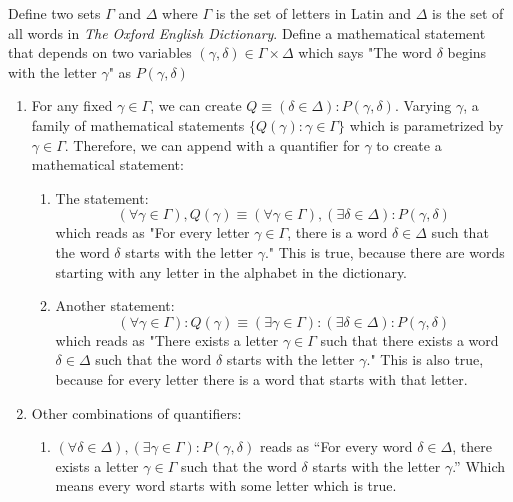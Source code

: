 \begin{example}
    Define two sets $\Gamma$ and $\Delta$ where $\Gamma$ is the set of letters in Latin and $\Delta$ is the set of all words in \textit{The Oxford English Dictionary}.
    Define a mathematical statement that depends on two variables $(\gamma,\delta) \in \Gamma \times \Delta$ which says "The word $\delta$ begins with the letter $\gamma$" as $P(\gamma,\delta)$

    \begin{enumerate}
        \item For any fixed $\gamma \in \Gamma$, we can create $Q \equiv (\delta \in \Delta): P(\gamma,\delta)$. Varying $\gamma$, a family of mathematical statements $\{Q(\gamma):\gamma \in \Gamma\}$ which is parametrized by $\gamma \in \Gamma$. Therefore, we can append with a quantifier for $\gamma$ to create a mathematical statement:
            \begin{enumerate}[label=(\alph*)]
                \item The statement:
                    $$
                    (\forall \gamma \in \Gamma), Q(\gamma) \equiv (\forall \gamma \in \Gamma), (\exists \delta \in \Delta) : P(\gamma,\delta)
                    $$
                    \noindent which reads as "For every letter $\gamma \in \Gamma$, there is a word $\delta \in \Delta$ such that the word $\delta$ starts with the letter $\gamma$." This is true, because there are words starting with any letter in the alphabet in the dictionary.

                \item Another statement:
                    $$
                    (\forall \gamma \in \Gamma): Q(\gamma) \equiv (\exists \gamma \in \Gamma) : (\exists \delta \in \Delta) : P(\gamma,\delta)
                    $$
                    \noindent which reads as "There exists a letter $\gamma \in \Gamma$ such that there exists a word $\delta \in \Delta$ such that the word $\delta$ starts with the letter $\gamma$." This is also true, because for every letter there is a word that starts with that letter.

            \end{enumerate}

        \item Other combinations of quantifiers:
            \begin{enumerate}[label=(\alph*)]
                \item $(\forall \delta \in \Delta), (\exists \gamma \in \Gamma) : P(\gamma,\delta)$ reads as ``For every word $\delta \in \Delta$, there exists a letter $\gamma \in \Gamma$ such that the word $\delta$ starts with the letter $\gamma$.'' Which means every word starts with some letter which is true.


\end{enumerate}
\end{enumerate}
\end{example}
